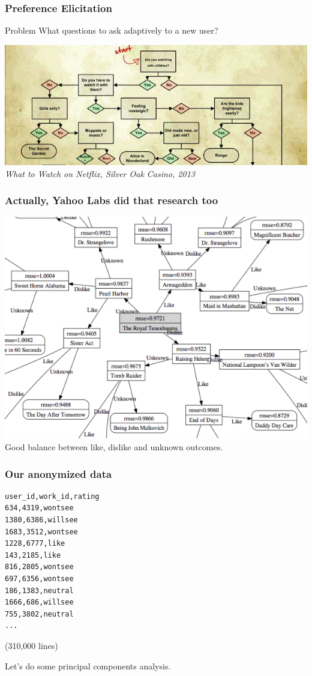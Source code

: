 \documentclass[]{beamer}
\begin{document}
\begin{frame}
  \frametitle{Preference Elicitation}
  \begin{block}{Problem}
      What questions to ask adaptively to a new user?
  \end{block}
  \centering
  \includegraphics[width=\linewidth]{figures/flowchart.png}\\
  \em What to Watch on Netflix, Silver Oak Casino, 2013
\end{frame}

\begin{frame}
  \frametitle{Actually, Yahoo Labs did that research too}
  \centering
  \includegraphics[width=0.9\linewidth]{figures/decisiontree.png}\\
  Good balance between like, dislike and unknown outcomes.
\end{frame}

\begin{frame}[fragile]
	\frametitle{Our anonymized data}
  \begin{verbatim}
user_id,work_id,rating
634,4319,wontsee
1380,6386,willsee
1683,3512,wontsee
1228,6777,like
143,2185,like
816,2805,wontsee
697,6356,wontsee
186,1383,neutral
1666,686,willsee
755,3802,neutral
...
  \end{verbatim}
  \vspace{-7mm}
  (310,000 lines)\bigskip

  Let's do some principal components analysis.
\end{frame}
\end{document}
